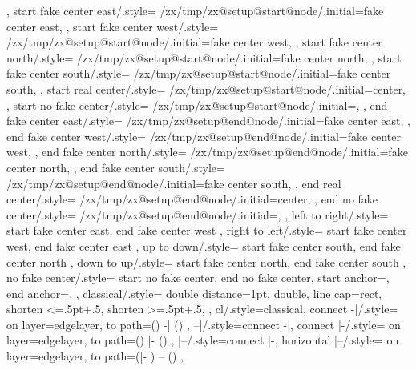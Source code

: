 {{{{        %
      }%
    },
    start fake center east/.style={%
      /zx/tmp/zx@setup@start@node/.initial=fake center east,
    },
    start fake center west/.style={%
      /zx/tmp/zx@setup@start@node/.initial=fake center west,
    },
    start fake center north/.style={%
      /zx/tmp/zx@setup@start@node/.initial=fake center north,
    },
    start fake center south/.style={%
      /zx/tmp/zx@setup@start@node/.initial=fake center south,
    },
    start real center/.style={
      /zx/tmp/zx@setup@start@node/.initial=center,
    },
    start no fake center/.style={
      /zx/tmp/zx@setup@start@node/.initial=,
    },
    end fake center east/.style={%
      /zx/tmp/zx@setup@end@node/.initial=fake center east,
    },
    end fake center west/.style={%
      /zx/tmp/zx@setup@end@node/.initial=fake center west,
    },
    end fake center north/.style={%
      /zx/tmp/zx@setup@end@node/.initial=fake center north,
    },
    end fake center south/.style={%
      /zx/tmp/zx@setup@end@node/.initial=fake center south,
    },
    end real center/.style={
      /zx/tmp/zx@setup@end@node/.initial=center,
    },
    end no fake center/.style={
      /zx/tmp/zx@setup@end@node/.initial=,
    },
    left to right/.style={
      start fake center east,
      end fake center west
    },
    right to left/.style={
      start fake center west,
      end fake center east
    },
    up to down/.style={
      start fake center south,
      end fake center north
    },
    down to up/.style={
      start fake center north,
      end fake center south
    },
    no fake center/.style={
      start no fake center,
      end no fake center,
      start anchor=,
      end anchor=,
    },
    classical/.style={
      double distance=1pt,
      double,
      line cap=rect,
      shorten <=.5pt+.5\pgflinewidth,
      shorten >=.5pt+.5\pgflinewidth,
    },
    cl/.style={classical},
    connect -|/.style={
      on layer={edgelayer},
      to path={(\tikztostart) -| (\tikztotarget) \tikztonodes}
    },
    --|/.style={connect -|},
    connect |-/.style={
      on layer={edgelayer},
      to path={(\tikztostart) |- (\tikztotarget) \tikztonodes}
    },
    |--/.style={connect |-},
    horizontal |--/.style={
      on layer={edgelayer},
      to path={(\tikztostart |- \tikztotarget) -- (\tikztotarget) \tikztonodes}
    },
}}

